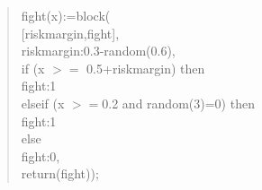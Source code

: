 \documentclass[]{article}
\begin{document}
\begin{quote}
	fight(x):=block(\\
\hspace*{10mm}	[riskmargin,fight],\\
\hspace*{20mm}	riskmargin:0.3-random(0.6),\\
\hspace*{10mm}	if (x $>=$ 0.5+riskmargin) then\\
\hspace*{20mm}	fight:1\\
\hspace*{10mm}	elseif (x $>=$0.2 and random(3)=0) then\\
\hspace*{20mm}	fight:1\\
\hspace*{10mm}	else\\
\hspace*{20mm}	fight:0,\\
\hspace*{10mm} return(fight));\\


\end{quote}
\end{document}
